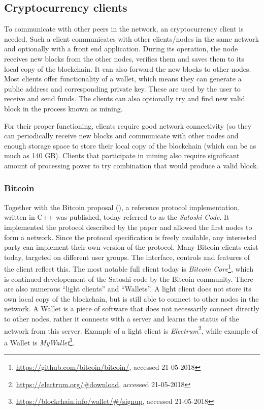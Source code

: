 \subsection{Cryptocurrency clients}\label{sec:eth-clients}
To communicate with other peers in the network, an cryptocurrency client is needed. Such a client communicates with other clients/nodes in the same network and optionally with a front end application. During its operation, the node receives new blocks from the other nodes, verifies them and saves them to its local copy of the blockchain. It can also forward the new blocks to other nodes. Most clients offer functionality of a wallet, which means they can generate a public address and corresponding private key. These are used by the user to receive and send funds. The clients can also optionally try and find new valid block in the process known as mining.

For their proper functioning, clients require good network connectivity (so they can periodically receive new blocks and communicate with other nodes and enough storage space to store their local copy of the blockchain (which can be as much as 140 GB\footnotemark). Clients that participate in mining also require significant amount of processing power to try combination that would produce a valid block.
% 

\subsubsection{Bitcoin}
Together with the Bitcoin proposal (\cite{NakamotoBitcoin:System}), a reference protocol implementation, written in C++ was published, today referred to as the \textit{Satoshi Code}\footnotemark. It implemented the protocol described by the paper and allowed the first nodes to form a network. Since the protocol specification is freely available, any interested party can implement their own version of the protocol.
% 
% 
Many Bitcoin clients exist today, targeted on different user groups. The interface, controls and features of the client reflect this. The most notable full client today is \textit{Bitcoin Core}\footnote{\url{https://github.com/bitcoin/bitcoin/}, accessed 21-05-2018}, which is continued developement of the Satoshi code by the Bitcoin community. There are also numerous ``light clients'' and ``Wallets''. A light client does not store its own local copy of the blockchain, but is still able to connect to other nodes in the network. A Wallet is a piece of software that does not necessarily connect directly to other nodes, rather it connects with a server and learns the status of the network from this server. Example of a light client is \textit{Electrum}\footnote{\url{https://electrum.org/#download}, accessed 21-05-2018}, while example of a Wallet is \textit{MyWallet}\footnote{\url{https://blockchain.info/wallet/#/signup}, accessed 21-05-2018}.

